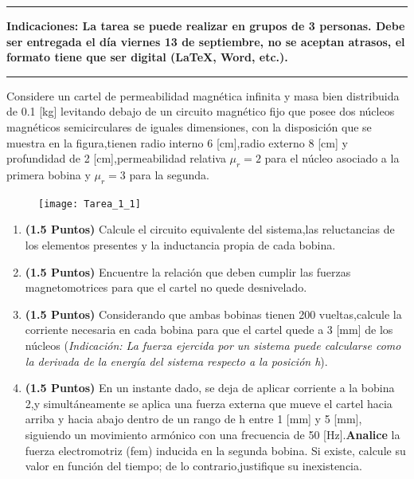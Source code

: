 \documentclass[
  11pt,
  letterpaper,
   addpoints,
   answers
  ]{exam}
\begin{document}
\vspace{0.5cm}
\noindent
\vspace{.85cm}
\hrule
\textbf{Indicaciones: La tarea se puede realizar en grupos de 3 personas. Debe ser entregada el día viernes 13 de septiembre, no se aceptan atrasos, el formato tiene que ser digital (LaTeX, Word, etc.).}
\hrule
\noindent
\vspace{.85cm}
\begin{questions}
    \question Considere un cartel de permeabilidad magnética infinita y masa bien distribuida de 0.1 [kg] levitando debajo de un circuito magnético fijo que posee dos núcleos magnéticos semicirculares de iguales dimensiones, con la disposición que se muestra en la figura,tienen radio interno 6 [cm],radio externo 8 [cm] y profundidad de 2 [cm],permeabilidad relativa $\mu_{r} = 2$ para el núcleo asociado a la primera bobina y $\mu_{r} = 3$ para la segunda.
    \begin{figure}[h!]
        \centering
        \texttt{[image: Tarea\_1\_1]}
    \end{figure}
    \begin{enumerate}[label=\alph*)]
        \item \textbf{(1.5 Puntos)} Calcule el circuito equivalente del sistema,las reluctancias de los elementos presentes y la inductancia propia de cada bobina.
        \item \textbf{(1.5 Puntos)} Encuentre la relación que deben cumplir las fuerzas magnetomotrices para que el cartel no quede desnivelado.
        \item \textbf{(1.5 Puntos)} Considerando que ambas bobinas tienen 200 vueltas,calcule la corriente necesaria en cada bobina para que el cartel quede a 3 [mm] de los núcleos (\textit{Indicación: La fuerza ejercida por un sistema puede calcularse como la derivada de la energía del sistema respecto a la posición h}).
        \item \textbf{(1.5 Puntos)} En un instante dado, se deja de aplicar corriente a la bobina 2,y simultáneamente se aplica una fuerza externa que mueve el cartel hacia arriba y hacia abajo dentro de un rango de h entre 1 [mm] y 5 [mm], siguiendo un movimiento armónico con una frecuencia de 50 [Hz].\textbf{Analice} la fuerza electromotriz (fem) inducida en la segunda bobina. Si existe, calcule su valor en función del tiempo; de lo contrario,justifique su inexistencia.
    \end{enumerate}
    


\end{questions}
\end{document}

